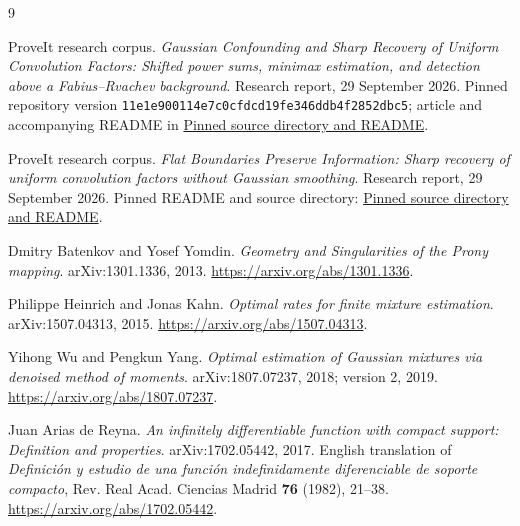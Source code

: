 \documentclass[11pt,a4paper]{article}
\numberwithin{equation}{section}
\theoremstyle{definition}
\theoremstyle{remark}
\begin{document}
\clearpage
{}
\begin{thebibliography}{9}
\raggedright
{}
ProveIt research corpus.
\emph{Gaussian Confounding and Sharp Recovery of Uniform Convolution Factors:
Shifted power sums, minimax estimation, and detection above a Fabius--Rvachev
background}. Research report, 29 September 2026.
Pinned repository version \texttt{11e1e900114e7c0cfdcd19fe346ddb4f2852dbc5};
article and accompanying README in
\href{https://github.com/VladimirReshetnikov/ProveIt/tree/11e1e900114e7c0cfdcd19fe346ddb4f2852dbc5/Analysis/FabiusFunction/docs/semi-formalized-research-frontiers/drafts/inverse-and-sampling/Gaussian_Confounding_Sharp_Recovery_Uniform_Factors}{Pinned source directory and README}.

ProveIt research corpus.
\emph{Flat Boundaries Preserve Information: Sharp recovery of uniform
convolution factors without Gaussian smoothing}.
Research report, 29 September 2026. Pinned README and source directory:
\href{https://github.com/VladimirReshetnikov/ProveIt/tree/11e1e900114e7c0cfdcd19fe346ddb4f2852dbc5/Analysis/FabiusFunction/docs/semi-formalized-research-frontiers/drafts/inverse-and-sampling/Flat_Boundaries_Sharp_Recovery_Uniform_Factors}{Pinned source directory and README}.

Dmitry Batenkov and Yosef Yomdin.
\emph{Geometry and Singularities of the Prony mapping}.
arXiv:1301.1336, 2013.
\url{https://arxiv.org/abs/1301.1336}.

Philippe Heinrich and Jonas Kahn.
\emph{Optimal rates for finite mixture estimation}.
arXiv:1507.04313, 2015.
\url{https://arxiv.org/abs/1507.04313}.

Yihong Wu and Pengkun Yang.
\emph{Optimal estimation of Gaussian mixtures via denoised method of moments}.
arXiv:1807.07237, 2018; version 2, 2019.
\url{https://arxiv.org/abs/1807.07237}.

Juan Arias de Reyna.
\emph{An infinitely differentiable function with compact support:
Definition and properties}.
arXiv:1702.05442, 2017. English translation of
\emph{Definici\'on y estudio de una funci\'on indefinidamente diferenciable de
soporte compacto}, Rev. Real Acad. Ciencias Madrid \textbf{76} (1982), 21--38.
\url{https://arxiv.org/abs/1702.05442}.
\end{thebibliography}
\end{document}
